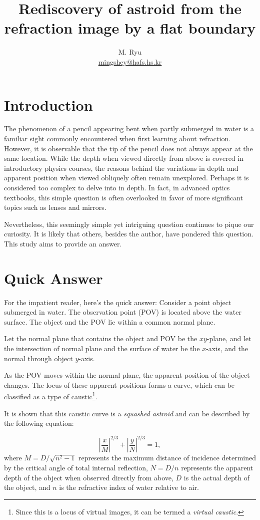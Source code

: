\documentclass[twocolumn]{article}
\title{Rediscovery of astroid from the refraction image by a flat boundary}
\author{M. Ryu \\ {\href{mailto:mingshey@hafs.hs.kr}{mingshey@hafs.hs.kr}}}
\begin{document}
\maketitle
\section{Introduction}
The phenomenon of a pencil appearing bent when partly submerged in water is a 
familiar sight commonly encountered when first learning about refraction. 
However, it is observable that the tip of the pencil does not always appear 
at the same location. While the depth when viewed directly from above is 
covered in introductory physics courses, the reasons behind the variations 
in depth and apparent position when viewed obliquely often remain unexplored. 
Perhaps it is considered too complex to delve into in depth. In fact, in 
advanced optics textbooks, this simple question is often overlooked in favor 
of more significant topics such as lenses and mirrors.

Nevertheless, this seemingly simple yet intriguing question continues to 
pique our curiosity. It is likely that others, besides the author, have 
pondered this question. This study aims to provide an answer.

\section{Quick Answer}
For the impatient reader, here's the quick answer:
Consider a point object submerged in water. The observation point (POV) is 
located above the water surface. The object and the POV lie within a common normal plane. 

Let the normal plane that contains the object and  POV be the $xy$-plane,
and let the intersection of  normal plane and the surface of water be the 
$x$-axis, and the normal through  object $y$-axis.

As the POV moves within the normal plane, the apparent position of the 
object changes. The locus of these apparent positions forms a curve, 
which can be classified as a type of caustic\footnote{Since this is a 
locus of virtual images, it can be termed a \emph{virtual caustic}.}. 

It is shown that this caustic curve is a \emph{squashed astroid}
and can be described by the following equation:

$$ \left| \dfrac{x}{M} \right| ^ {2/3} + \left| \dfrac{y}{N} \right| ^ {2/3} = 1,$$
where 
$M = D/\sqrt{n^2 - 1}$ represents the maximum distance of incidence determined 
by the critical angle of total internal reflection, 
$N = D/n$ represents the apparent depth of the object when observed directly 
from above,
$D$ is the actual depth of the object, and
$n$ is the refractive index of water relative to air.
\end{document}

